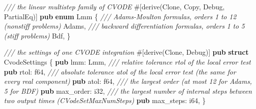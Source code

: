 \documentclass[
  10pt,
]{article}
\newenvironment{Shaded}{}{}
\newcommand{\AttributeTok}[1]{\textcolor[rgb]{0.49,0.56,0.16}{#1}}
\newcommand{\BuiltInTok}[1]{\textcolor[rgb]{0.00,0.50,0.00}{#1}}
\newcommand{\CommentTok}[1]{\textcolor[rgb]{0.38,0.63,0.69}{\textit{#1}}}
\newcommand{\DataTypeTok}[1]{\textcolor[rgb]{0.56,0.13,0.00}{#1}}
\newcommand{\KeywordTok}[1]{\textcolor[rgb]{0.00,0.44,0.13}{\textbf{#1}}}
\newcommand{\NormalTok}[1]{#1}
\newcommand{\OperatorTok}[1]{\textcolor[rgb]{0.40,0.40,0.40}{#1}}
\begin{document}
\begin{Shaded}
\begin{Highlighting}[]
\CommentTok{/// the linear multistep family of CVODE}
\AttributeTok{\#[}\NormalTok{derive}\AttributeTok{(}\BuiltInTok{Clone}\OperatorTok{,} \BuiltInTok{Copy}\OperatorTok{,} \BuiltInTok{Debug}\OperatorTok{,} \BuiltInTok{PartialEq}\AttributeTok{)]}
\KeywordTok{pub} \KeywordTok{enum}\NormalTok{ Lmm }\OperatorTok{\{}
    \CommentTok{/// Adams{-}Moulton formulas, orders 1 to 12 (nonstiff problems)}
\NormalTok{    Adams}\OperatorTok{,}
    \CommentTok{/// backward differentiation formulas, orders 1 to 5 (stiff problems)}
\NormalTok{    Bdf}\OperatorTok{,}
\OperatorTok{\}}

\CommentTok{/// the settings of one CVODE integration}
\AttributeTok{\#[}\NormalTok{derive}\AttributeTok{(}\BuiltInTok{Clone}\OperatorTok{,} \BuiltInTok{Debug}\AttributeTok{)]}
\KeywordTok{pub} \KeywordTok{struct}\NormalTok{ CvodeSettings }\OperatorTok{\{}
    \KeywordTok{pub}\NormalTok{ lmm}\OperatorTok{:}\NormalTok{ Lmm}\OperatorTok{,}
    \CommentTok{/// relative tolerance rtol of the local error test}
    \KeywordTok{pub}\NormalTok{ rtol}\OperatorTok{:} \DataTypeTok{f64}\OperatorTok{,}
    \CommentTok{/// absolute tolerance atol of the local error test (the same for every real component)}
    \KeywordTok{pub}\NormalTok{ atol}\OperatorTok{:} \DataTypeTok{f64}\OperatorTok{,}
    \CommentTok{/// the largest order (at most 12 for Adams, 5 for BDF)}
    \KeywordTok{pub}\NormalTok{ max\_order}\OperatorTok{:} \DataTypeTok{i32}\OperatorTok{,}
    \CommentTok{/// the largest number of internal steps between two output times (CVodeSetMaxNumSteps)}
    \KeywordTok{pub}\NormalTok{ max\_steps}\OperatorTok{:} \DataTypeTok{i64}\OperatorTok{,}
\OperatorTok{\}}


\end{Highlighting}
\end{Shaded}
\end{document}
